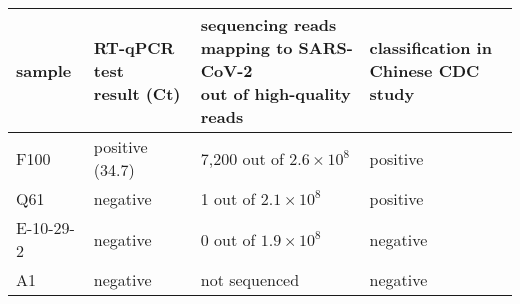 \documentclass[9pt,twocolumn,twoside]{gsajnl_modified}
\begin{document}
\begin{tabular}{llll}
\toprule
sample & \makecell[l]{RT-qPCR test \\ result (Ct)} & \makecell[l]{sequencing reads \\ mapping to SARS-CoV-2 \\ out of high-quality reads} & \makecell[l]{classification in \\ Chinese CDC study} \\
\midrule
F100 & positive (34.7) & 7,200 out of $2.6 \times 10^8$ & positive \\
Q61 & negative & 1 out of $2.1 \times 10^8$ & positive \\
E-10-29-2 & negative & 0 out of $1.9 \times 10^8$ & negative \\
A1 & negative & not sequenced & negative \\
\bottomrule
\end{tabular}
\end{document}
